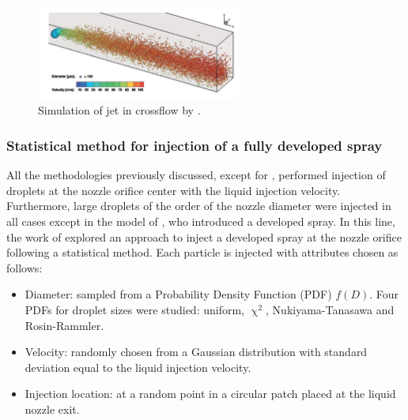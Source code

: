 \begin{figure}[ht]
    \centering
    \includegraphics[width=0.6\textwidth]{./part1_numerical_approaches/figures_ch3/eckel_2016_jet}
       \centering
    \caption{Simulation of jet in crossflow by .}
    \label{fig:eckel_2016_jet}
\end{figure}


\subsubsection*{Statistical method for injection of a fully developed spray }

All the methodologies previously discussed, except for , performed injection of droplets at the nozzle orifice center with the liquid injection velocity. Furthermore, large droplets of the order of the nozzle diameter were injected in all cases except in the model of , who introduced a developed spray. In this line, the work of  explored an approach to inject a developed spray at the nozzle orifice following a statistical method. Each particle is injected with attributes chosen as follows:

\begin{itemize}
	
	\item Diameter: sampled from a Probability Density Function (PDF) $f \left(  D \right)$. Four PDFs for droplet sizes were studied: uniform, $\upchi^2$, Nukiyama-Tanasawa and Rosin-Rammler.

	\item Velocity: randomly chosen from a Gaussian distribution with standard deviation equal to the liquid injection velocity.
	
	\item Injection location: at a random point in a circular patch placed at the liquid nozzle exit.

\end{itemize}

